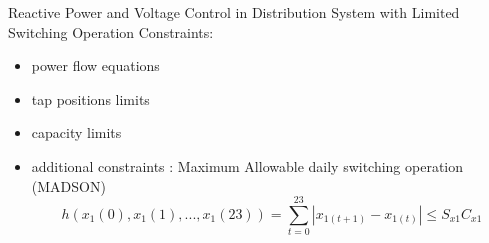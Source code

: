 \documentclass[10pt]{beamer}
\begin{document}
\begin{frame}{Reactive Power and Voltage Control in Distribution System with Limited Switching Operation}
Constraints:
\begin{itemize}
\item power flow equations
\item tap positions limits
\item capacity limits
\item additional constraints : Maximum Allowable daily switching operation (MADSON)
\[ h(x_1(0),x_1(1),..., x_1(23)) = \sum_{t=0}^{23} |x_{1(t+1)} -x_{1(t)}| \leq S_{x1}C_{x1}\]
\end{itemize}
\end{frame}

%
%
%
\end{document}
